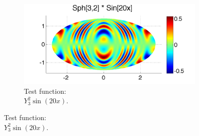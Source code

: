 \begin{figure}
\begin{center}
	\centering
	\begin{subfigure}[t]{0.48\textwidth}
	\centering
	\includegraphics[width=1.0\textwidth]{../figures/appendices/direct_vs_indirect_weights/compare_weight_generation/xsfc_vs_xsfc_alt_on_sph32_times_sine_20x/sph32_times_sin20x-eps-converted-to.pdf}
	\caption{Test function:  \\ $Y_{3}^{2} \sin(20 x) $.  }
		\label{fig:direct_vs_indirect_manufactured_base}
	\end{subfigure}
	

\end{center}
\end{figure}
